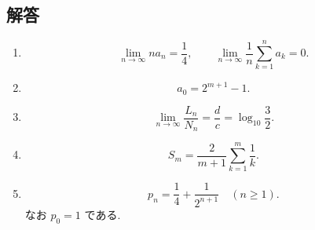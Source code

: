     \subsection{解答}\label{節：大学過去問ベースのもの：解答}
      \begin{enumerate}[label=\textbf{問\arabic*.},leftmargin=3.8em,format=\bookitemlink{practice-entrance}{answer}{problem}]
        \item \[
            \lim_{n\to\infty}na_n=\frac14,
            \qquad
            \lim_{n\to\infty}\frac1n\sum_{k=1}^{n}a_k=0.
          \]
        \item \[
            a_0=2^{m+1}-1.
          \]
        \item \[
            \lim_{n\to\infty}\frac{L_n}{N_n}
            =\frac{d}{c}
            =\log_{10}\frac32
            .
          \]
        \item \[
            S_m=\frac2{m+1}\sum_{k=1}^{m}\frac1k
            .
          \]
        \item \[
            p_n=\frac14+\frac1{2^{n+1}}\quad(n\ge1)
            .
          \]
              なお \(p_0=1\) である.
      \end{enumerate}


